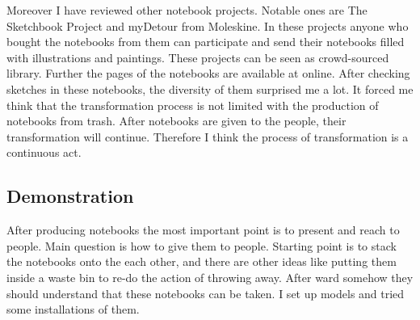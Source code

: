 Moreover I have reviewed other notebook projects. Notable ones are The Sketchbook Project and myDetour from Moleskine. In these projects anyone who bought the notebooks from them can participate and send their notebooks filled with illustrations and paintings. These projects can be seen as crowd-sourced library. Further the pages of the notebooks are available at online. After checking sketches in these notebooks, the diversity of them surprised me a lot. It forced me think that the transformation process is not limited with the production of notebooks from trash. After notebooks are given to the people, their transformation will continue. Therefore I think the process of transformation is a continuous act.










\subsection{Demonstration}
After producing notebooks the most important point is to present and reach to people. Main question is how to give them to people. Starting point is to stack the notebooks onto the each other, and there are other ideas like putting them inside a waste bin to re-do the action of throwing away. After ward somehow they should understand that these notebooks can be taken. I set up models and tried some installations of them.


